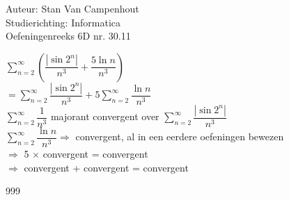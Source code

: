 \documentclass[a4paper]{article}
\begin{document}
  
\noindent \large Auteur: Stan Van Campenhout \\
\noindent \large Studierichting:  Informatica\\
\noindent \large Oefeningenreeks 6D nr. 30.11\\

\medskip

\normalsize

$ \displaystyle\sum\limits_{n = 2}^\infty\left(\dfrac{\left|\sin 2^n\right|}{n^3}+\dfrac{5\ln n}{n^3}\right) $\\

$ = \displaystyle\sum\limits_{n = 2}^\infty\dfrac{\left|\sin 2^n\right|}{n^3} + 5\displaystyle\sum_{n=2}^\infty\dfrac{\ln n}{n^3} $\\

$ \displaystyle\sum\limits_{n = 2}^\infty\dfrac{1}{n^3} $ majorant convergent over $  \displaystyle\sum\limits_{n = 2}^\infty\dfrac{\left|\sin 2^n\right|}{n^3} $\\

$ \displaystyle\sum_{n=2}^\infty\dfrac{\ln n}{n^3} \Rightarrow $ convergent, al in een eerdere oefeningen bewezen \\

$ \Rightarrow $ 5 $\times$ convergent = convergent \\

$ \Rightarrow $ convergent + convergent = convergent \\

\begin{thebibliography}{999}
\end{thebibliography}
\end{document}
